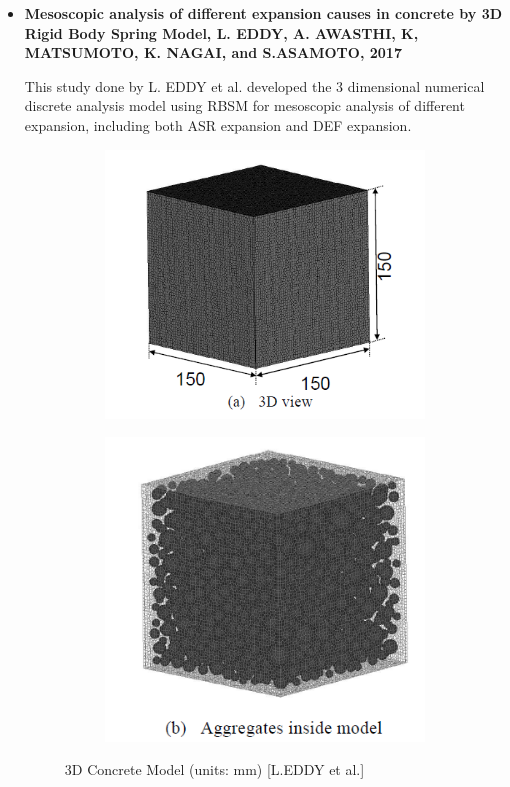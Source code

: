 \begin{itemize}
    \item
    \textbf{Mesoscopic analysis of different expansion causes in concrete by 3D Rigid Body Spring Model, L. EDDY, A. AWASTHI, K, MATSUMOTO, K. NAGAI, and S.ASAMOTO, 2017}

    This study done by L. EDDY et al.\cite{EDDY} developed the 3 dimensional numerical discrete analysis model using RBSM for mesoscopic analysis of different expansion, including both ASR expansion and DEF expansion.


    \begin{figure}[ht!]
    \centering
    \begin{subfigure}{.5\textwidth}
      \centering
      \includegraphics[width=.9\linewidth]{Files/Background/EDDY_model_1.png}
    \end{subfigure}%
    \begin{subfigure}{.5\textwidth}
      \centering
      \includegraphics[width=.75\linewidth]{Files/Background/EDDY_model_2.png}
    \end{subfigure}
    \caption{3D Concrete Model (units: mm) [L.EDDY et al.]}
    \label{fig:EDDY_model}
    \end{figure}


\end{itemize}

